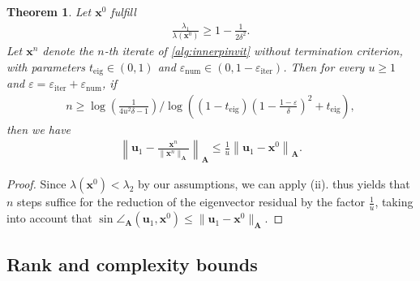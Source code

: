 \documentclass[a4paper,11pt,oneside]{amsart}
\newtheorem{theorem}{Theorem}
\theoremstyle{definition}
\theoremstyle{remark}
\newcommand{\A}{\ten A}
\newcommand{\ten}[1]{\boldsymbol{#1}}
\newcommand{\enum}{\ensuremath{\varepsilon_{\mathrm{num}}}}
\newcommand{\eiter}{\ensuremath{\varepsilon_{\mathrm{iter}}}}
\newcommand{\teig}{t_{\mathrm{eig}}}
\numberwithin{equation}{section}
\numberwithin{theorem}{section}
\begin{document}
\begin{theorem}\label{thm:reduction}
 Let $\ten x^0$ fulfill
\begin{align*}
%
 \frac{\lambda_1}{\lambda(\ten x^0)} \geq 1 - \frac{1}{2 \delta^2}.
\end{align*}
Let $\ten x^n$ denote the $n$-th iterate of \cref{alg:innerpinvit} without termination criterion, with parameters $\teig \in (0,1)$ and $\enum \in (0,1 - \eiter)$.
 Then for every $u \geq 1$ and $\varepsilon = \eiter + \enum$, if
 \begin{align*}
  n \geq  \log \left( \frac{1}{4u^2 \delta - 1}  \right) / \log \left( \left(1 - \teig \right) \left(1 - \frac{1 - \varepsilon}{\delta} \right)^2 + \teig \right),
 \end{align*}
then we have
 \begin{align*}
 \left\| \ten u_1 - \frac{\ten x^n}{\| \ten x^n \|_{\A}} \right\|_{\A} \leq \frac{1}{u} \left\| \ten u_1 - \ten x^0 \right\|_{\A}.
 \end{align*}
\end{theorem}
\begin{proof}
Since $\lambda(\ten x^0) < \lambda_2$ by our assumptions, we can apply (ii).  thus yields that $n$ steps suffice for the reduction of the eigenvector residual by the factor $\frac{1}{u}$, taking into account that $\sin \angle_{\A}(\ten u_1,\ten x^0) \leq \| \ten u_1 - \ten x^0 \|_{\A}$.
\end{proof}


\subsection{Rank and complexity bounds}\label{sec:outeriter}
\end{document}
